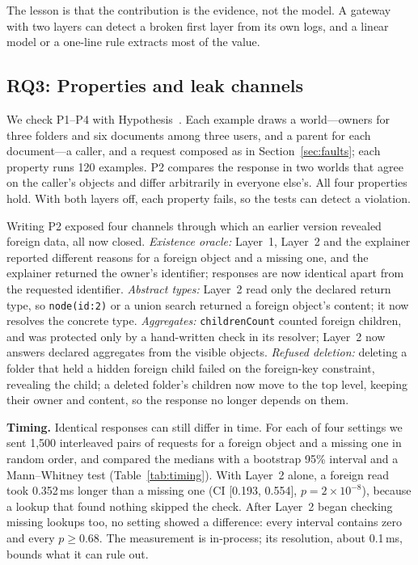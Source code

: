 \documentclass[conference]{IEEEtran}
\newcommand{\code}[1]{\texttt{\small #1}}
\begin{document}
The lesson is that the contribution is the evidence, not the model. A gateway with two layers can detect a broken first layer from its own logs, and a linear model or a one-line rule extracts most of the value.

\subsection{RQ3: Properties and leak channels}
We check P1--P4 with Hypothesis~\cite{hypothesis}. Each example draws a world---owners for three folders and six documents among three users, and a parent for each document---a caller, and a request composed as in Section~\ref{sec:faults}; each property runs 120 examples. P2 compares the response in two worlds that agree on the caller's objects and differ arbitrarily in everyone else's. All four properties hold. With both layers off, each property fails, so the tests can detect a violation.

Writing P2 exposed four channels through which an earlier version revealed foreign data, all now closed. \emph{Existence oracle:} Layer~1, Layer~2 and the explainer reported different reasons for a foreign object and a missing one, and the explainer returned the owner's identifier; responses are now identical apart from the requested identifier. \emph{Abstract types:} Layer~2 read only the declared return type, so \code{node(id:2)} or a union search returned a foreign object's content; it now resolves the concrete type. \emph{Aggregates:} \code{childrenCount} counted foreign children, and was protected only by a hand-written check in its resolver; Layer~2 now answers declared aggregates from the visible objects. \emph{Refused deletion:} deleting a folder that held a hidden foreign child failed on the foreign-key constraint, revealing the child; a deleted folder's children now move to the top level, keeping their owner and content, so the response no longer depends on them.

\textbf{Timing.} Identical responses can still differ in time. For each of four settings we sent 1,500 interleaved pairs of requests for a foreign object and a missing one in random order, and compared the medians with a bootstrap 95\% interval and a Mann--Whitney test (Table~\ref{tab:timing}). With Layer~2 alone, a foreign read took 0.352\,ms longer than a missing one (CI [0.193, 0.554], $p=2\times10^{-8}$), because a lookup that found nothing skipped the check. After Layer~2 began checking missing lookups too, no setting showed a difference: every interval contains zero and every $p\geq0.68$. The measurement is in-process; its resolution, about 0.1\,ms, bounds what it can rule out.
\end{document}
